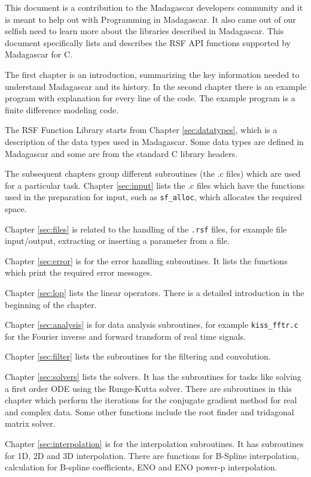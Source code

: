 This document is a contribution to the Madagascar developers community and it is meant to help out with Programming in Madagascar. It also came out of our selfish need to learn more about the libraries described in Madagascar. This document specifically lists and describes the RSF API functions supported by Madagascar for C. 

The first chapter is an introduction, summarizing the key information needed to understand Madagascar and its history. In the second chapter there is an example program with explanation for every line of the code. The example program is a finite difference modeling code.

The RSF Function Library starts from Chapter \ref{sec:datatypes}, which is a description of the data types used in Madagascar. Some data types are defined in Madagascar and some are from the standard C library headers. 


The subsequent chapters group different subroutines (the .c files) which are used for a particular task. Chapter \ref{sec:input} lists the .c files which have the functions used in the preparation for input, such as \texttt{sf\_alloc}, which allocates the required space.
 
Chapter \ref{sec:files} is related to the handling of the \texttt{.rsf} files, for example file input/output, extracting or inserting a parameter from a file.
 
Chapter \ref{sec:error} is for the error handling subroutines. It lists the functions which print the required error messages.
 
Chapter \ref{sec:lop} lists the linear operators. There is a detailed introduction in the beginning of the chapter.
 
Chapter \ref{sec:analysis} is for data analysis subroutines, for example \texttt{kiss\_fftr.c} for the Fourier inverse and forward transform of real time signals.
 
Chapter \ref{sec:filter} lists the subroutines for the filtering and convolution.
 
Chapter \ref{sec:solvers} lists the solvers. It has the subroutines for tasks like solving a first order ODE using the Runge-Kutta solver. There are subroutines in this chapter which perform the iterations for the conjugate gradient method for real and complex data. Some other functions include the root finder and tridagonal matrix solver.
 
Chapter \ref{sec:interpolation} is for the interpolation subroutines. It has subroutines for 1D, 2D and 3D interpolation. There are functions for B-Spline interpolation, calculation for B-spline coefficients, ENO and ENO power-p interpolation.
 
